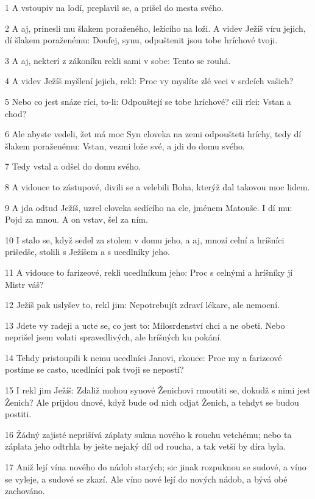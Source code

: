 \par 1 A vstoupiv na lodí, preplavil se, a prišel do mesta svého.
\par 2 A aj, prinesli mu šlakem poraženého, ležícího na loži. A videv Ježíš víru jejich, dí šlakem poraženému: Doufej, synu, odpuštenit jsou tobe hríchové tvoji.
\par 3 A aj, nekterí z zákoníku rekli sami v sobe: Tento se rouhá.
\par 4 A videv Ježíš myšlení jejich, rekl: Proc vy myslíte zlé veci v srdcích vašich?
\par 5 Nebo co jest snáze ríci, to-li: Odpouštejí se tobe hríchové? cili ríci: Vstan a chod?
\par 6 Ale abyste vedeli, žet má moc Syn cloveka na zemi odpoušteti hríchy, tedy dí šlakem poraženému: Vstan, vezmi lože své, a jdi do domu svého.
\par 7 Tedy vstal a odšel do domu svého.
\par 8 A vidouce to zástupové, divili se a velebili Boha, kterýž dal takovou moc lidem.
\par 9 A jda odtud Ježíš, uzrel cloveka sedícího na cle, jménem Matouše. I dí mu: Pojd za mnou. A on vstav, šel za ním.
\par 10 I stalo se, když sedel za stolem v domu jeho, a aj, mnozí celní a hríšníci prišedše, stolili s Ježíšem a s ucedlníky jeho.
\par 11 A vidouce to farizeové, rekli ucedlníkum jeho: Proc s celnými a hríšníky jí Mistr váš?
\par 12 Ježíš pak uslyšev to, rekl jim: Nepotrebujít zdraví lékare, ale nemocní.
\par 13 Jdete vy radeji a ucte se, co jest to: Milosrdenství chci a ne obeti. Nebo neprišel jsem volati spravedlivých, ale hríšných ku pokání.
\par 14 Tehdy pristoupili k nemu ucedlníci Janovi, rkouce: Proc my a farizeové postíme se casto, ucedlníci pak tvoji se nepostí?
\par 15 I rekl jim Ježíš: Zdaliž mohou synové Ženichovi rmoutiti se, dokudž s nimi jest Ženich? Ale prijdou dnové, když bude od nich odjat Ženich, a tehdyt se budou postiti.
\par 16 Žádný zajisté neprišívá záplaty sukna nového k rouchu vetchému; nebo ta záplata jeho odtrhla by ješte nejaký díl od roucha, a tak vetší by díra byla.
\par 17 Aniž lejí vína nového do nádob starých; sic jinak rozpuknou se sudové, a víno se vyleje, a sudové se zkazí. Ale víno nové lejí do nových nádob, a bývá obé zachováno.
